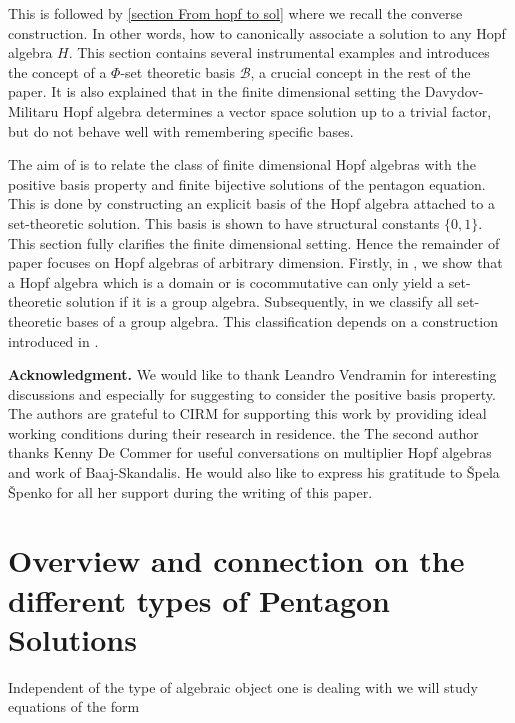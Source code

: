 \documentclass[a4paper,10pt]{amsart}
\theoremstyle{definition}
\theoremstyle{remark}
\newcommand\mc{\mathcal}
\begin{document}
This is followed by \cref{section From hopf to sol} where we recall the converse construction. In other words, how to canonically associate a solution to any Hopf algebra $H$. This section contains several instrumental examples and introduces the concept of a $\Phi$-set theoretic basis $\mc{B}$, a crucial concept in the rest of the paper. It is also explained that in the finite dimensional setting the Davydov-Militaru Hopf algebra determines a vector space solution up to a trivial factor, but do not behave well with remembering specific bases.


The aim of  is to relate the class of finite dimensional Hopf algebras with the positive basis property and finite bijective solutions of the pentagon equation. This is done by constructing an explicit basis of the Hopf algebra attached to a set-theoretic solution. This basis is shown to have structural constants $\{ 0,1 \}$. 
This section fully clarifies the finite dimensional setting. Hence the remainder of paper focuses on Hopf algebras of arbitrary dimension. Firstly, in , we show that a Hopf algebra which is a domain or is cocommutative can only yield a set-theoretic solution if it is a group algebra. Subsequently,
in  we classify all set-theoretic bases of a group algebra. This classification depends on a construction introduced in . \smallskip




\vspace{0,2cm}
\noindent \textbf{Acknowledgment.} We would like to thank Leandro Vendramin for interesting discussions and especially for suggesting to consider the positive basis property. The authors are grateful to CIRM for supporting this work by providing ideal working conditions during their research in residence. the  The second author thanks Kenny De Commer for useful conversations on multiplier Hopf algebras and work of Baaj-Skandalis. He would also like to express his gratitude to \v{S}pela \v{S}penko for all her support during the writing of this paper.

\section{Overview and connection on the different types of Pentagon Solutions}\label{section overview sols}

Independent of the type of algebraic object one is dealing with we will study equations of the form
\end{document}
